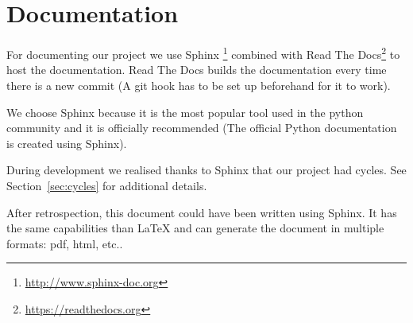 \section{Documentation}
\label{sec:documentation}

For documenting our project we use Sphinx
\footnote{\url{http://www.sphinx-doc.org}} combined with Read
The Docs\footnote{\url{https://readthedocs.org}} to host the
documentation. Read The Docs builds the documentation every time there is a new
commit (A git hook has to be set up beforehand for it to work).

We choose Sphinx because it is the most popular tool used in the python
community and it is officially recommended (The official Python documentation is
created using Sphinx).

During development we realised thanks to Sphinx that our project had cycles. See
Section~\ref{sec:cycles} for additional details.

After retrospection, this document could have been written using Sphinx. It has
the same capabilities than \LaTeX{} and can generate the document in multiple
formats: pdf, html, etc..
